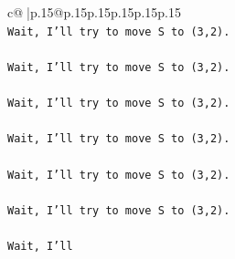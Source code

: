 \documentclass{article}
\begin{document}
{\begin{supertabular}{c@{$\;$}|p{.15\linewidth}@{}p{.15\linewidth}p{.15\linewidth}p{.15\linewidth}p{.15\linewidth}p{.15\linewidth}}
{{{\\ 
\texttt{Wait, I'll try to move S to (3,2).} \\
\\ 
\texttt{Wait, I'll try to move S to (3,2).} \\
\\ 
\texttt{Wait, I'll try to move S to (3,2).} \\
\\ 
\texttt{Wait, I'll try to move S to (3,2).} \\
\\ 
\texttt{Wait, I'll try to move S to (3,2).} \\
\\ 
\texttt{Wait, I'll try to move S to (3,2).} \\
\\ 
\texttt{Wait, I'll} \\
            }
        }
    }
     \\ \\


\end{supertabular}}
\end{document}
